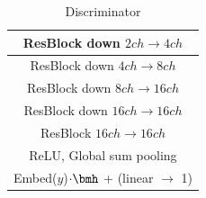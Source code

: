 \begin{table}[ht]
\begin{subtable}{.4\textwidth}
{\begin{tabular}{c}
                  \midrule
                  ResBlock down $2ch \rightarrow 4ch$\\
                  \midrule
                  ResBlock down $4ch \rightarrow 8ch$\\
                  \midrule
                  ResBlock down $8ch \rightarrow 16ch$\\
                  \midrule
                  ResBlock down $16ch \rightarrow 16ch$\\
                  \midrule
                  ResBlock $16ch \rightarrow 16ch$\\
                  \midrule
                  ReLU, Global sum pooling\\
                  \midrule
                  Embed($y$)$\cdot \bmh$ + (linear $\rightarrow$ 1) \\
                  \midrule
                  \bottomrule
              \end{tabular}}
              \caption{\label{tab:dis_resnet_imagenet_128} Discriminator}
          \end{subtable}
\end{table}

